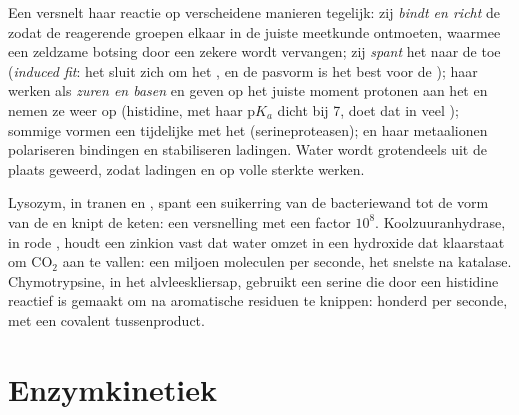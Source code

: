 \begin{proposition}\label{prop:b1:enzymes:mechanisms}
Een  versnelt haar reactie op verscheidene manieren tegelijk: zij
\emph{bindt en richt} de  zodat de reagerende groepen elkaar in de juiste
meetkunde ontmoeten, waarmee een zeldzame botsing door een zekere wordt vervangen;
zij \emph{spant} het  naar de  toe (\emph{induced
fit}: het  sluit zich om het , en de pasvorm is
het best voor de ); haar  werken als \emph{zuren en
basen} en geven op het juiste moment protonen aan het  en nemen ze weer
op (histidine, met haar p$K_a$ dicht bij 7, doet dat in veel ); sommige
vormen een tijdelijke \emph{} met het  (serineproteasen);
en haar metaalionen polariseren bindingen en stabiliseren ladingen. Water wordt
grotendeels uit de plaats geweerd, zodat ladingen en  op volle
sterkte werken.
\end{proposition}

\begin{example}\label{ex:b1:enzymes:three}
Lysozym, in tranen en , spant een suikerring van de bacteriewand tot de vorm
van de  en knipt de keten: een versnelling met een factor $10^8$.
Koolzuuranhydrase, in rode , houdt een zinkion vast dat water omzet in een
hydroxide dat klaarstaat om $\mathrm{CO_2}$ aan te vallen: een miljoen moleculen
per seconde, het snelste  na katalase. Chymotrypsine, in het
alvleeskliersap, gebruikt een serine die door een histidine reactief is gemaakt om
 na aromatische residuen te knippen: honderd per seconde, met een covalent
tussenproduct.
\end{example}

\section{Enzymkinetiek}

